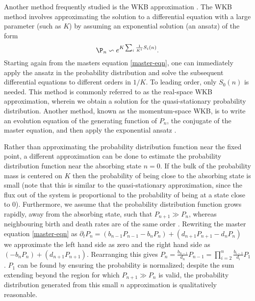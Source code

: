 \documentclass[a4paper,10pt]{article}
\numberwithin{equation}{section} %
\begin{document}
Another method frequently studied is the WKB approximation \cite{}.
The WKB method involves approximating the solution to a differential equation with a large parameter (such as $K$) by assuming an exponential solution (an ansatz) of the form
\begin{equation}
\P_n \backsim e^{K\sum_i \frac{1}{K^i}S_i(n)}.
\label{ansatz}
\end{equation}
Starting again from the masters equation \ref{master-eqn}, one can immediately apply the ansatz in the probability distribution and solve the subsequent differential equations to different orders in $1/K$\cite{Assaf2016,etc}.%
To leading order, only $S_0(n)$ is needed. 
This method is commonly referred to as the real-space WKB approximation, wherein we obtain a solution for the quasi-stationary probability distribution.
Another method, known as the momentum-space WKB, is to write an evolution equation of the generating function of $P_n$, the conjugate of the master equation, and then apply the exponential ansatz \cite{Generating function stuff}.

Rather than approximating the probability distribution function near the fixed point, a different approximation can be done to estimate the probability distribution function near the absorbing state $n=0$. %
If the bulk of the probability mass is centered on $K$ then the probability of being close to the absorbing state is small (note that this is similar to the quasi-stationary approximation, since the flux out of the system is proportional to the probability of being at a state close to $0$). 
Furthermore, we assume that the probability distribution function grows rapidly, away from the absorbing state, such that $P_{n+1}\gg P_n$, whereas neighbouring birth and death rates are of the same order \cite{smalln}. 
Rewriting the master equation \ref{master-eqn} as $\partial_t P_n = \left(b_{n-1} P_{n-1} - b_n P_n \right) + \left(d_{n+1}P_{n+1} - d_n P_n\right)$ we approximate the left hand side as zero and the right hand side as $\left(-b_n P_n \right) + \left( d_{n+1} P_{n+1}\right)$. 
Rearranging this gives $P_n = \frac{b_{n-1}}{d_n}P_{n-1} = \prod_{i=2}^n \frac{b_{i-1}}{d_i} P_{1}$. %
$P_{1}$ can be found by ensuring the probability is normalized; despite the sum extending beyond the region for which $P_{n+1}\gg P_n$ is valid, the probability distribution generated from this small $n$ approximation is qualitatively reasonable. 
\end{document}
